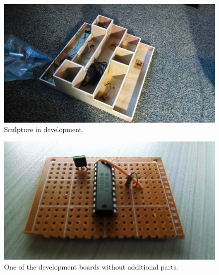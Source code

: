 \documentclass{article}
\begin{document}


\begin{figure}[p]
    \centering
    \includegraphics[width=1\textwidth]{sculpture-wip.jpg}
    \caption{Sculpture in development.}
    \label{fig:wip}
\end{figure}

\begin{figure}[p]
    \centering
    \includegraphics[width=1\textwidth]{board.jpg}
    \caption{One of the development boards without additional parts.}
    \label{fig:board}
\end{figure}
\end{document}
